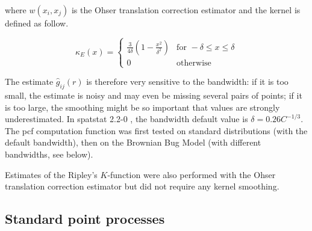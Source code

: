 \documentclass[english]{article}
\begin{document}
where $w(x_{i},x_{j})$ is the Ohser translation correction estimator
\citep{ohser_estimators_1983} and the kernel is defined as follow.

\begin{equation}
\kappa_{E}(x)=\begin{cases}
\frac{3}{4\delta}\left(1-\frac{x^{2}}{\delta^{2}}\right) & \text{for }-\delta\leq x\leq\delta\\
0 & \text{otherwise}
\end{cases}
\end{equation}

The estimate $\hat{g}_{ij}(r)$ is therefore very sensitive to the
bandwidth: if it is too small, the estimate is noisy and may even
be missing several pairs of points; if it is too large, the smoothing
might be so important that values are strongly underestimated. In
spatstat 2.2-0 \citep{baddeley_spatstat}, the bandwidth default value
is $\delta=0.26C^{-1/3}$. The pcf computation function was first
tested on standard distributions (with the default bandwidth), then
on the Brownian Bug Model (with different bandwidths, see below). 

\medskip{}

Estimates of the Ripley's $K$-function were also performed with the
Ohser translation correction estimator  but did not require any kernel
smoothing.

\subsection{Standard point processes}
\end{document}
